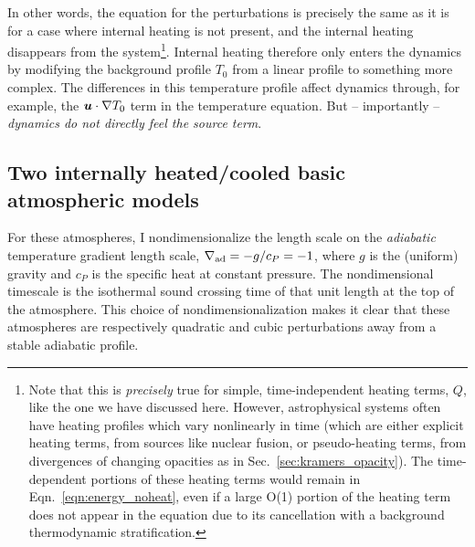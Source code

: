 In other words, the equation for the perturbations is precisely the same as it is for a case where internal heating is not present, and the internal heating disappears from the system\footnote{
Note that this is \emph{precisely} true for simple, time-independent heating terms, $Q$, like the one we have discussed here.
However, astrophysical systems often have heating profiles which vary nonlinearly in time (which are either explicit heating terms, from sources like nuclear fusion, or pseudo-heating terms, from divergences of changing opacities as in Sec.~\ref{sec:kramers_opacity}).
The time-dependent portions of these heating terms would remain in Eqn.~\ref{eqn:energy_noheat}, even if a large O(1) portion of the heating term does not appear in the equation due to its cancellation with a background thermodynamic stratification.
}.
Internal heating therefore only enters the dynamics by modifying the background profile $T_0$ from a linear profile to something more complex.
The differences in this temperature profile affect dynamics through, for example, the $\bm{u}\cdot\nabla T_0$ term in the temperature equation.
But -- importantly -- \emph{dynamics do not directly feel the source term}.

\subsection{Two internally heated/cooled basic atmospheric models}
\label{sec:atmospheres}
For these atmospheres, I nondimensionalize the length scale on the \emph{adiabatic} temperature gradient length scale, $\nabla_{\text{ad}} = -g/c_P = -1$, where $g$ is the (uniform) gravity and $c_P$ is the specific heat at constant pressure.
The nondimensional timescale is the isothermal sound crossing time of that unit length at the top of the atmosphere.
This choice of nondimensionalization makes it clear that these atmospheres are respectively quadratic and cubic perturbations away from a stable adiabatic profile.

